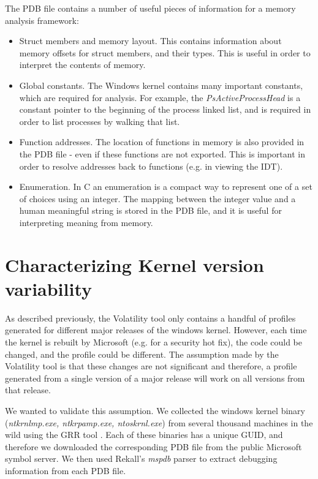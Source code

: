 The PDB file contains a number of useful pieces of information for a memory
analysis framework:
\begin{itemize}

\item Struct members and memory layout. This contains information about memory
  offsets for struct members, and their types. This is useful in order to
  interpret the contents of memory.

\item Global constants. The Windows kernel contains many important constants,
  which are required for analysis. For example, the {\em PsActiveProcessHead} is
  a constant pointer to the beginning of the process linked list, and is
  required in order to list processes by walking that list.

\item Function addresses. The location of functions in memory is also provided
  in the PDB file - even if these functions are not exported. This is important
  in order to resolve addresses back to functions (e.g. in viewing the IDT).

\item Enumeration. In C an enumeration is a compact way to represent one of a
  set of choices using an integer. The mapping between the integer value and a
  human meaningful string is stored in the PDB file, and it is useful for
  interpreting meaning from memory.
\end{itemize}

\section{Characterizing Kernel version variability}
\label{kernel_variability}
As described previously, the Volatility tool only contains a handful of profiles
generated for different major releases of the windows kernel. However, each time
the kernel is rebuilt by Microsoft (e.g. for a security hot fix), the code could
be changed, and the profile could be different. The assumption made by the
Volatility tool is that these changes are not significant and therefore, a
profile generated from a single version of a major release will work on all
versions from that release.

We wanted to validate this assumption. We collected the windows kernel binary
({\em ntkrnlmp.exe, ntkrpamp.exe, ntoskrnl.exe}) from several thousand machines
in the wild using the GRR tool \citep{cohen2011distributed}. Each of these
binaries has a unique GUID, and therefore we downloaded the corresponding PDB
file from the public Microsoft symbol server. We then used Rekall's {\em mspdb}
parser to extract debugging information from each PDB file.

